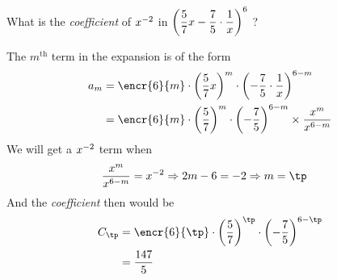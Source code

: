 \gcalcexpr[0]

\question What is the \textit{coefficient} of $x^{-2}$ in $\left( \dfrac{5}{7} x - \dfrac{7}{5}\cdot\dfrac{1}{x} \right)^{6}$ ?

\insertQR[-30pt]{}

\watchout

\ifprintanswers
\fi 

\begin{solution}
	The $m^{\text{th}}$ term in the expansion is of the form 
	\begin{align}
	   a_m &= \encr{\vbthree}{m}\cdot\left( \vbone x \right)^{m}\cdot\left( -\vbtwo\cdot\dfrac{1}{x}\right)^{\vbthree - m} \\
	   &= \encr{\vbthree}{m}\cdot\left(\vbone\right)^{m}\cdot\left( -\vbtwo \right)^{\vbthree - m}\times\dfrac{x^m}{x^{\vbthree - m}}
	\end{align}
	We will get a $x^{-2}$ term when 
	\begin{align}
		\dfrac{x^m}{x^{\vbthree - m}} &= x^{\vbfour} \Rightarrow 2m - \vbthree = \vbfour \Rightarrow m = \tp
	\end{align}
	And the \textit{coefficient} then would be 
	\begin{align}
		C_{\tp} &= \encr{\vbthree}{\tp}\cdot\left(\vbone\right)^{\tp}\cdot\left( -\vbtwo \right)^{\vbthree - \tp} \\
		&= \vbfive
	\end{align}
\end{solution}
